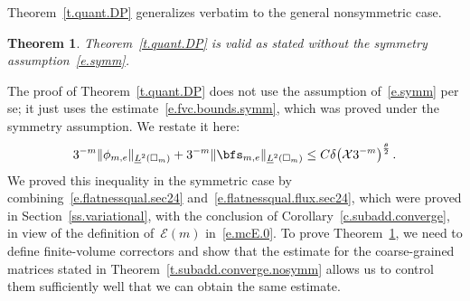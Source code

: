 \documentclass[11pt,twoside]{article} %
\let\oldsquare\square %
\renewcommand{\square}{\oldsquare}
\numberwithin{equation}{section}
\newtheorem{theorem}{Theorem}[section]
\theoremstyle{definition}
\newcommand{\cu}{\square}
\newcommand{\X}{\mathcal{X}}
\begin{document}
Theorem~\ref{t.quant.DP} generalizes verbatim to the general nonsymmetric case. 

\begin{theorem}
\label{t.quant.DP.nosymm}Theorem~\ref{t.quant.DP} is valid as stated without the symmetry assumption~\eqref{e.symm}. 
\end{theorem}

The proof of Theorem~\ref{t.quant.DP} does not use the assumption of~\eqref{e.symm} per se; it just uses the estimate~\eqref{e.fvc.bounds.symm}, which was proved under the symmetry assumption. We restate it here: 
\begin{equation}
\label{e.FV.sublinearity.nosymm}
3^{-m} \| \phi_{m,e} \|_{\underline{L}^2(\cu_m)} 
+
3^{-m} \| \bfs_{m,e} \|_{\underline{L}^2(\cu_m)} 
\leq 
C \delta \bigl( \X 3^{-m} \bigr)^{\frac\theta 2}
\,.
\end{equation}
We proved this inequality in the symmetric case by combining~\eqref{e.flatnessqual.sec24} and~\eqref{e.flatnessqual.flux.sec24}, which were proved in Section~\ref{ss.variational}, with the conclusion of 
Corollary~\ref{c.subadd.converge}, in view of the definition of~$\mathcal{E}(m)$ in~\eqref{e.mcE.0}. 
To prove Theorem~\ref{t.quant.DP.nosymm}, we need to define finite-volume correctors and show that the estimate for the coarse-grained matrices stated in Theorem~\ref{t.subadd.converge.nosymm} allows us to control them sufficiently well that we can obtain the same estimate. 


\smallskip
\end{document}
